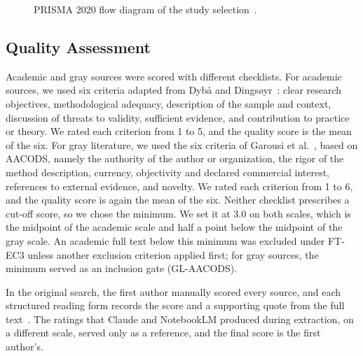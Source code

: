 \documentclass[preprint,number]{elsarticle}
\newcounter{study}
\begin{document}
\begin{figure}[!htbp]
{%
}
\caption{PRISMA 2020 flow diagram of the study selection~\cite{page2021prisma}.}
\label{fig:prisma}
\end{figure}

\subsection{Quality Assessment}
\label{sec:quality}

Academic and gray sources were scored with different checklists. For academic sources, we used six criteria adapted from Dyb{\aa} and Dings{\o}yr~\cite{dyba2008empirical}: clear research objectives, methodological adequacy, description of the sample and context, discussion of threats to validity, sufficient evidence, and contribution to practice or theory. We rated each criterion from 1 to 5, and the quality score is the mean of the six. For gray literature, we used the six criteria of Garousi et al.~\cite{garousi2019mlr}, based on AACODS, namely the authority of the author or organization, the rigor of the method description, currency, objectivity and declared commercial interest, references to external evidence, and novelty. We rated each criterion from 1 to 6, and the quality score is again the mean of the six. Neither checklist prescribes a cut-off score, so we chose the minimum. We set it at 3.0 on both scales, which is the midpoint of the academic scale and half a point below the midpoint of the gray scale. An academic full text below this minimum was excluded under FT-EC3 unless another exclusion criterion applied first; for gray sources, the minimum served as an inclusion gate (GL-AACODS).

In the original search, the first author manually scored every source, and each structured reading form records the score and a supporting quote from the full text~\cite{replication2026}. The ratings that Claude and NotebookLM produced during extraction, on a different scale, served only as a reference, and the final score is the first author's. 
\end{document}
